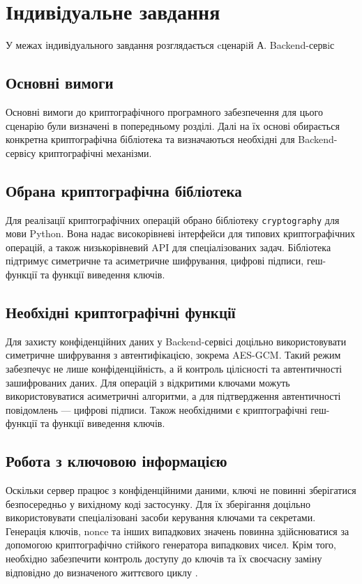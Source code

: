 \section{Індивідуальне завдання}

У межах індивідуального завдання розглядається cценарiй А. Backend-сервiс

\subsection{Основні вимоги}

Основні вимоги до криптографічного програмного забезпечення для цього сценарію
були визначені в попередньому розділі. Далі на їх основі обирається конкретна
криптографічна бібліотека та визначаються необхідні для Backend-сервісу
криптографічні механізми.

\subsection{Обрана криптографічна бібліотека}

Для реалізації криптографічних операцій обрано бібліотеку
\texttt{cryptography} для мови Python. Вона надає високорівневі інтерфейси
для типових криптографічних операцій, а також низькорівневий API для
спеціалізованих задач. Бібліотека підтримує симетричне та асиметричне
шифрування, цифрові підписи, геш-функції та функції виведення ключів\cite{cryptography}.

\subsection{Необхідні криптографічні функції}

Для захисту конфіденційних даних у Backend-сервісі доцільно використовувати
симетричне шифрування з автентифікацією, зокрема AES-GCM. Такий режим
забезпечує не лише конфіденційність, а й контроль цілісності та автентичності
зашифрованих даних.
Для операцій з відкритими ключами можуть використовуватися асиметричні
алгоритми, а для підтвердження автентичності повідомлень --- цифрові
підписи. Також необхідними є криптографічні геш-функції та функції виведення
ключів\cite{cryptography}.

\subsection{Робота з ключовою інформацією}

Оскільки сервер працює з конфіденційними даними, ключі не повинні
зберігатися безпосередньо у вихідному коді застосунку. Для їх зберігання
доцільно використовувати спеціалізовані засоби керування ключами та секретами.
Генерація ключів, nonce та інших випадкових значень повинна здійснюватися
за допомогою криптографічно стійкого генератора випадкових чисел. Крім
того, необхідно забезпечити контроль доступу до ключів та їх своєчасну
заміну відповідно до визначеного життєвого циклу \cite{OWASP}.

